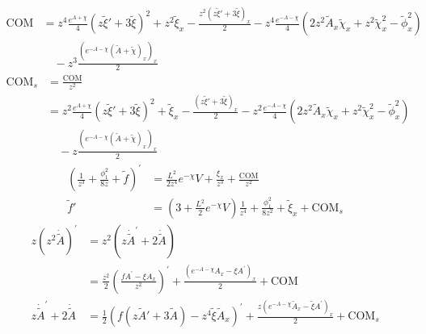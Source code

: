 \documentclass[12pt,a4paper]{ctexart}
\numberwithin{equation}{section}
\begin{document}
\begin{equation}
    \begin{aligned}
        \mathrm{COM}&=z^4\frac{e^{A+\chi}}{4}(z\tilde{\xi}'+3\tilde{\xi})^2+z^2\tilde{\xi}_{x}-\frac{z^2(z\tilde{\xi}'+3\tilde{\xi})_{x}}{2}-z^4\frac{e^{-A-\chi}}{4}(2z^2\tilde{A}_x\tilde{\chi}_x+z^2\tilde{\chi}_{x}^2-\tilde{\phi}_x^2)\\
        &\quad-z^3\frac{(e^{-A-\chi}(\tilde{A}+\tilde{\chi})_x)_{x}}{2}
    \end{aligned}
\end{equation}
\begin{equation}
    \begin{aligned}
        \mathrm{COM}_s&=\frac{\mathrm{COM}}{z^2}\\
        &=z^2\frac{e^{A+\chi}}{4}(z\tilde{\xi}'+3\tilde{\xi})^2+\tilde{\xi}_{x}-\frac{(z\tilde{\xi}'+3\tilde{\xi})_{x}}{2}-z^2\frac{e^{-A-\chi}}{4}(2z^2\tilde{A}_x\tilde{\chi}_x+z^2\tilde{\chi}_{x}^2-\tilde{\phi}_x^2)\\
        &\quad-z\frac{(e^{-A-\chi}(\tilde{A}+\tilde{\chi})_x)_{x}}{2}
    \end{aligned}
\end{equation}
\begin{equation}
    \begin{aligned}
        (\frac{1}{z^{3}}+\frac{\phi_1^2}{8z}+\tilde{f})^{\prime}&=\frac{L^{2}}{2z^{4}}e^{-\chi}V+\frac{\xi_{x}}{z^{3}}+\frac{\mathrm{COM}}{z^{2}}\\
        \tilde{f}'&=(3+\frac{L^{2}}{2}e^{-\chi}V)\frac{1}{z^4}+\frac{\phi_1^2}{8z^2}+\tilde{\xi}_{x}+\mathrm{COM}_s
    \end{aligned}
\end{equation}
\begin{equation}
    \begin{aligned}
        z(z^2\dot{\tilde{A}})^{\prime}&=z^2(z\dot{\tilde{A}}^{\prime}+2\dot{\tilde{A}})\\
        &=\frac{z^{2}}{2}(\frac{fA^{\prime}-\xi A_{x}}{z^{2}})^{\prime}+\frac{(e^{-A-\chi}A_{x}-\xi A^{\prime})_{x}}{2}+\mathrm{COM}\\
        z\dot{\tilde{A}}^{\prime}+2\dot{\tilde{A}}&=\frac{1}{2}(f(z\tilde{A}'+3\tilde{A})-z^4\tilde{\xi}\tilde{A}_{x})^{\prime}+\frac{z(e^{-A-\chi}\tilde{A}_{x}-\tilde{\xi} A^{\prime})_{x}}{2}+\mathrm{COM}_s
    \end{aligned}
\end{equation}
\end{document}
